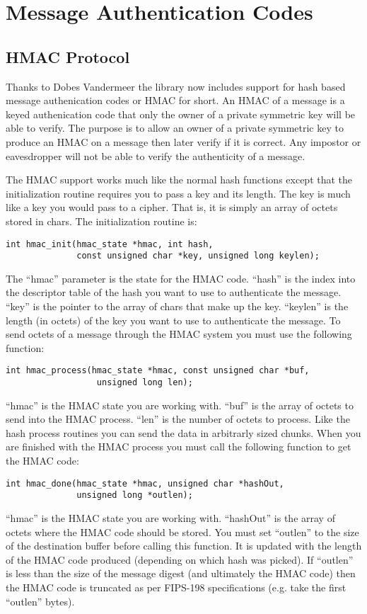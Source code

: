 \documentclass[b5paper]{book}
\begin{document}
\chapter{Message Authentication Codes}
\section{HMAC Protocol}
Thanks to Dobes Vandermeer the library now includes support for hash based message authenication codes or HMAC for short.  An HMAC
of a message is a keyed authenication code that only the owner of a private symmetric key will be able to verify.  The purpose is
to allow an owner of a private symmetric key to produce an HMAC on a message then later verify if it is correct.  Any impostor or
eavesdropper will not be able to verify the authenticity of a message.  

The HMAC support works much like the normal hash functions except that the initialization routine requires you to pass a key 
and its length.  The key is much like a key you would pass to a cipher.  That is, it is simply an array of octets stored in
chars.  The initialization routine is:
\begin{verbatim}
int hmac_init(hmac_state *hmac, int hash, 
              const unsigned char *key, unsigned long keylen);
\end{verbatim}
The ``hmac'' parameter is the state for the HMAC code.  ``hash'' is the index into the descriptor table of the hash you want
to use to authenticate the message.  ``key'' is the pointer to the array of chars that make up the key.  ``keylen'' is the
length (in octets) of the key you want to use to authenticate the message.  To send octets of a message through the HMAC system you must use the following function:
\begin{verbatim}
int hmac_process(hmac_state *hmac, const unsigned char *buf,
                  unsigned long len);
\end{verbatim}
``hmac'' is the HMAC state you are working with. ``buf'' is the array of octets to send into the HMAC process.  ``len'' is the
number of octets to process.  Like the hash process routines you can send the data in arbitrarly sized chunks. When you 
are finished with the HMAC process you must call the following function to get the HMAC code:
\begin{verbatim}
int hmac_done(hmac_state *hmac, unsigned char *hashOut,
              unsigned long *outlen);
\end{verbatim}
``hmac'' is the HMAC state you are working with.  ``hashOut'' is the array of octets where the HMAC code should be stored.  You must
set ``outlen'' to the size of the destination buffer before calling this function.  It is updated with the length of the HMAC code
produced (depending on which hash was picked).  If ``outlen'' is less than the size of the message digest (and ultimately
the HMAC code) then the HMAC code is truncated as per FIPS-198 specifications (e.g. take the first ``outlen'' bytes).
\end{document}
